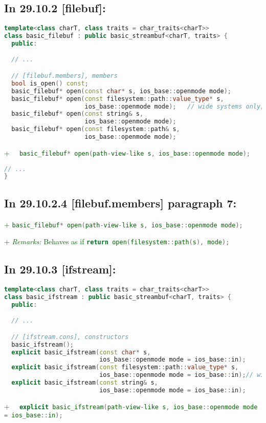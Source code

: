 \documentclass[11pt]{article}
\newcommand{\code}[2][cpp]{\lstinline[language=#1,basicstyle=\small\ttfamily]{#2}}
\newcommand{\desc}[1]{\textit{#1}}
\newcommand{\remarks}{\desc{Remarks: }}
\newcommand{\tsrefp}[3]{\subsection*{In #2 \textbf{[#1]} paragraph #3:}}
\newcommand{\tsref}[2]{\subsection*{In #2 \textbf{[#1]}:}}
\newcommand{\tsreplace}[3]{\textcolor{red}{\sout{#1}}#2\textcolor{darkgreen}{#3}}
\begin{document}
\tsref{filebuf}{29.10.2}

\begin{lstlisting}[language=cpp]
template<class charT, class traits = char_traits<charT>>
class basic_filebuf : public basic_streambuf<charT, traits> {
  public:

  // ...

  // [filebuf.members], members
  bool is_open() const;
  basic_filebuf* open(const char* s, ios_base::openmode mode);
  basic_filebuf* open(const filesystem::path::value_type* s,
                      ios_base::openmode mode);   // wide systems only; see [fstream.syn]
  basic_filebuf* open(const string& s,
                      ios_base::openmode mode);
  basic_filebuf* open(const filesystem::path& s,
                      ios_base::openmode mode);
\end{lstlisting}

\tsreplace{}{}{+ \code{  basic_filebuf* open(path-view-like s, ios_base::openmode mode);}}

\begin{lstlisting}[language=cpp]
  // ...
}
\end{lstlisting}

\tsrefp{filebuf.members}{29.10.2.4}{7}

\tsreplace{}{}{+ \code{basic_filebuf* open(path-view-like s, ios_base::openmode mode);}}

\tsreplace{}{}{+ \remarks Behaves as if \code{return open(filesystem::path(s), mode);}}

\tsref{ifstream}{29.10.3}

\begin{lstlisting}[language=cpp]
template<class charT, class traits = char_traits<charT>>
class basic_ifstream : public basic_streambuf<charT, traits> {
  public:

  // ...

  // [ifstream.cons], constructors
  basic_ifstream();
  explicit basic_ifstream(const char* s,
                          ios_base::openmode mode = ios_base::in);
  explicit basic_ifstream(const filesystem::path::value_type* s,
                          ios_base::openmode mode = ios_base::in);// wide systems only; see [fstream.syn]
  explicit basic_ifstream(const string& s,
                          ios_base::openmode mode = ios_base::in);
\end{lstlisting}

\tsreplace{}{}{+ \code{  explicit basic_ifstream(path-view-like s,
ios_base::openmode mode = ios_base::in);}}
\end{document}
